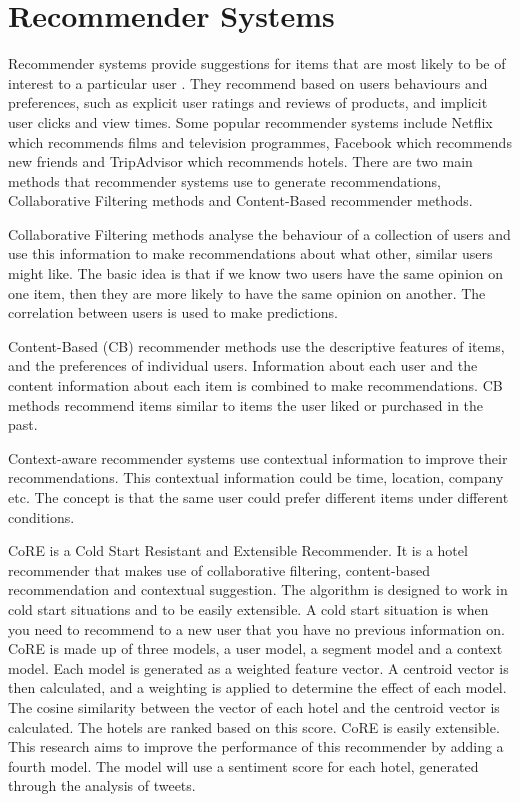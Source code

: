 \section{Recommender Systems}
Recommender systems provide suggestions for items that are most likely to be of interest to a particular user \cite{Ricci2015}. They recommend based on users behaviours and preferences, such as explicit user ratings and reviews of products, and implicit user clicks and view times. Some popular recommender systems include Netflix which recommends films and television programmes, Facebook which recommends new friends and TripAdvisor which recommends hotels. There are two main methods that recommender systems use to generate recommendations, Collaborative Filtering methods and Content-Based recommender methods. 

Collaborative Filtering methods analyse the behaviour of a collection of users and use this information to make recommendations about what other, similar users might like. The basic idea is that if we know two users have the same opinion on one item, then they are more likely to have the same opinion on another. The correlation between users is used to make predictions.

Content-Based (CB) recommender methods use the descriptive features of items, and the preferences of individual users. Information about each user and the content information about each item is combined to make recommendations. CB methods recommend items similar to items the user liked or purchased in the past.

Context-aware recommender systems use contextual information to improve their recommendations. This contextual information could be time, location, company etc. The concept is that the same user could prefer different items under different conditions.

CoRE \cite{core2019} is a Cold Start Resistant and Extensible Recommender. It is a hotel recommender that makes use of collaborative filtering, content-based recommendation and contextual suggestion. The algorithm is designed to work in cold start situations and to be easily extensible. A cold start situation is when you need to recommend to a new user that you have no previous information on. CoRE is made up of three models, a user model, a segment model and a context model. Each model is generated as a weighted feature vector. A centroid vector is then calculated, and a weighting is applied to determine the effect of each model. The cosine similarity between the vector of each hotel and the centroid vector is calculated. The hotels are ranked based on this score. CoRE is easily extensible. This research aims to improve the performance of this recommender by adding a fourth model. The model will use a sentiment score for each hotel, generated through the analysis of tweets. 

